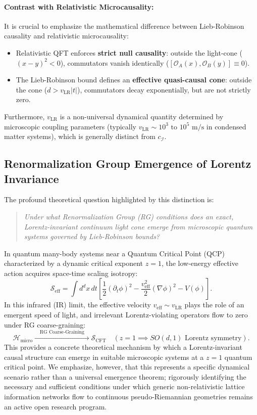 \documentclass[11pt,a4paper]{article}
\begin{document}
\paragraph{Contrast with Relativistic Microcausality:}
It is crucial to emphasize the mathematical difference between Lieb-Robinson causality and relativistic microcausality:
\begin{itemize}
    \item Relativistic QFT enforces \textbf{strict null causality}: outside the light-cone ($(x-y)^2 < 0$), commutators vanish identically ($[\mathcal{O}_A(x), \mathcal{O}_B(y)] \equiv 0$).
    \item The Lieb-Robinson bound defines an \textbf{effective quasi-causal cone}: outside the cone ($d > v_{\text{LR}} |t|$), commutators decay exponentially, but are not strictly zero.
\end{itemize}
Furthermore, $v_{\text{LR}}$ is a non-universal dynamical quantity determined by microscopic coupling parameters (typically $v_{\text{LR}} \sim 10^3\text{ to } 10^5\text{ m/s}$ in condensed matter systems), which is generally distinct from $c_{\mathcal{I}}$.

\subsection{Renormalization Group Emergence of Lorentz Invariance}

The profound theoretical question highlighted by this distinction is:
\begin{quote}
\emph{Under what Renormalization Group (RG) conditions does an exact, Lorentz-invariant continuum light cone emerge from microscopic quantum systems governed by Lieb-Robinson bounds?}
\end{quote}

In quantum many-body systems near a Quantum Critical Point (QCP) characterized by a dynamic critical exponent $z = 1$, the low-energy effective action acquires space-time scaling isotropy:
\begin{equation}
\mathcal{S}_{\text{eff}} = \int d^d x \, dt \left[ \frac{1}{2} (\partial_t \phi)^2 - \frac{v_{\text{eff}}^2}{2} (\nabla \phi)^2 - V(\phi) \right].
\end{equation}
In this infrared (IR) limit, the effective velocity $v_{\text{eff}} \sim v_{\text{LR}}$ plays the role of an emergent speed of light, and irrelevant Lorentz-violating operators flow to zero under RG coarse-graining:
\begin{equation}
\mathcal{H}_{\text{micro}} \xrightarrow{\quad\text{RG Coarse-Graining}\quad} \mathcal{S}_{\text{CFT}} \quad (z = 1 \implies SO(d, 1) \text{ Lorentz symmetry}).
\end{equation}
This provides a concrete theoretical mechanism by which a Lorentz-invariant causal structure can emerge in suitable microscopic systems at a $z = 1$ quantum critical point. We emphasize, however, that this represents a specific dynamical scenario rather than a universal emergence theorem; rigorously identifying the necessary and sufficient conditions under which generic non-relativistic lattice information networks flow to continuous pseudo-Riemannian geometries remains an active open research program.
\end{document}
